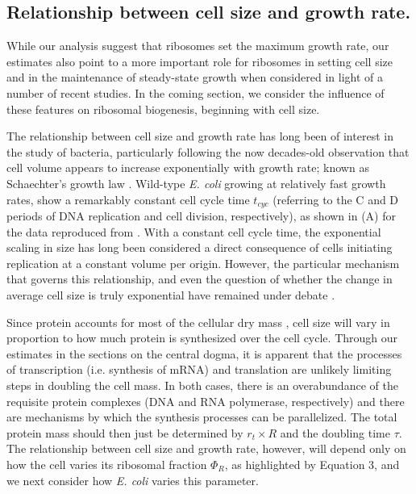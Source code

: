\subsection{Relationship between cell size and growth rate.}

While our analysis suggest that ribosomes set the maximum growth rate,  our
estimates also point to a more important role for ribosomes in setting cell
size and in the maintenance of steady-state growth  when considered in light of
a number of recent studies. In the coming section, we consider the influence of
these features on ribosomal biogenesis, beginning with cell size.

The relationship between cell size and growth rate has long been of interest in
the study of bacteria, particularly following the now decades-old observation
that cell volume appears to increase exponentially with growth rate; known as
Schaechter's growth law  \citep{schaechter1958, taheriaraghi2015}. Wild-type
\textit{E. coli} growing at relatively fast growth rates, show a remarkably
constant cell cycle time $t_{cyc}$ (referring to the C and D periods of DNA
replication and cell division, respectively), as shown in
(A) for the data reproduced from \citep{si2017}.
With a constant cell cycle time, the exponential scaling in size has long been
considered a direct consequence of cells initiating replication at a constant
volume per origin. However, the particular mechanism that governs this
relationship, and even the question of whether the change in average cell size
is truly exponential  have remained under debate \citep{si2017, harris2018}.

Since protein accounts for most of the cellular dry mass \citep{bremer2008,
basan2015}, cell size will vary in proportion to how much protein is
synthesized over the cell cycle.  Through our estimates in the sections on the
central dogma, it is apparent that the processes of transcription (i.e.
synthesis of mRNA) and translation are unlikely limiting steps in doubling the
cell mass. In both cases, there is an overabundance of the requisite protein
complexes (DNA and RNA polymerase, respectively) and there are mechanisms by
which the synthesis processes can be parallelized. The total protein mass should
then just be determined by $r_t \times R$ and the doubling time
$\tau$. The relationship between cell size and growth rate, however, will
depend only on how the cell varies its ribosomal fraction $\Phi_R$, as highlighted by
Equation 3, and we next consider how \textit{E. coli} varies this parameter.


